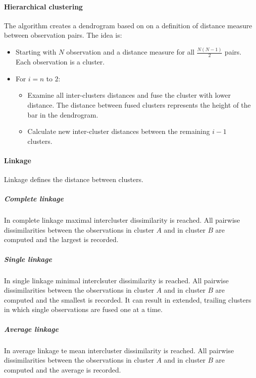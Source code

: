 			\paragraph{Hierarchical clustering}
			The algorithm creates a dendrogram based on on a definition of distance measure between observation pairs.
			The idea is:

			\begin{multicols}{2}
				\begin{itemize}
					\item Starting with $N$ observation and a distance measure for all $\frac{N(N-1)}{2}$ pairs.
						Each observation is a cluster.
					\item For $i =n$ to $2$:

						\begin{itemize}
							\item Examine all inter-clusters distances and fuse the cluster with lower distance.
								The distance between fused clusters represents the height of the bar in the dendrogram.
							\item Calculate new inter-cluster distances between the remaining $i-1$ clusters.
						\end{itemize}

				\end{itemize}
			\end{multicols}

			\paragraph{Linkage}
			Linkage defines the distance between clusters.

				\subparagraph{Complete linkage}
				In complete linkage maximal intercluster dissimilarity is reached.
				All pairwise dissimilarities between the observations in cluster $A$ and in cluster $B$ are computed and the largest is recorded.

				\subparagraph{Single linkage}
				In single linkage minimal interclsuter dissimilarity is reached.
				All pairwise dissimilarities between the observations in cluster $A$ and in cluster $B$ are computed and the smallest is recorded.
				It can result in extended, trailing clusters in which single observations are fused one at a time.

				\subparagraph{Average linkage}
				In average linkage te mean intercluster dissimilarity  is reached.
				All pairwise dissimilarities between the observations in cluster $A$ and in cluster $B$ are computed and the average is recorded.

